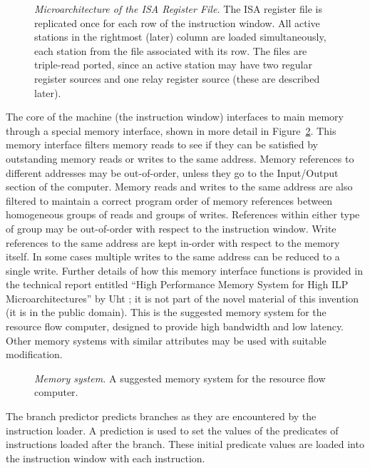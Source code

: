 \documentclass[10pt,dvips]{article}
\begin{document}
\begin{figure}
\centering
{}
\caption{{\em Microarchitecture of the ISA Register File.} The ISA register file is
replicated once for each row of the instruction window. All active stations in the
rightmost (later) column are loaded simultaneously, each station from the file
associated with its row. The files are triple-read ported, since an active station
may have two regular register sources and one relay register source (these are
described later).}
\label{isaregisters}
\end{figure}

The core of the machine (the instruction window) interfaces to
main memory through a special memory interface, shown in more
detail in Figure~\ref{memory}.  This memory interface filters memory
reads to see if they can be satisfied by outstanding memory
reads or writes to the same address.  Memory references to different
addresses may be out-of-order, unless they go to the Input/Output
section of the computer. Memory reads and writes to the same address
are also filtered to maintain a correct program order of memory
references between homogeneous groups of reads and groups of writes.
References within either type of group may be out-of-order with
respect to the instruction
window. Write references to the same address are kept in-order with respect to
the memory itself. In some cases multiple writes to the same address can be
reduced to a single write. Further details of how this memory interface
functions is provided in the technical report entitled
``High Performance Memory System for High ILP Microarchitectures''
by Uht \cite{Uht97e}; it is not part of the novel material of this invention
(it is in the public domain).
This is the suggested memory system for the
resource flow computer,
designed to provide high bandwidth and low latency. Other memory
systems with similar attributes may be used with suitable modification.

\begin{figure}
\centering
{}
\caption{{\em Memory system.} A suggested memory system for the resource flow
computer.}
\label{memory}
\end{figure}

The branch predictor predicts branches as they are encountered by the instruction
loader. A prediction is used to set the values of the predicates of instructions
loaded after the branch. These initial predicate values are loaded into the
instruction window with each instruction.
\end{document}
